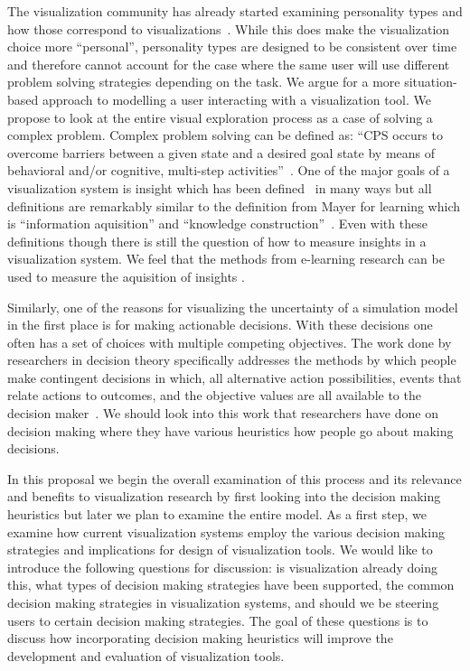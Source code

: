 The visualization community has already started examining personality types and
how those correspond to visualizations~\citep{Conati:2014}. While this does
make the visualization choice more ``personal'', personality types are designed
to be consistent over time and therefore cannot account for the case where the
same user will use different problem solving strategies depending on the task.
We argue for a more situation-based approach to modelling a user interacting
with a visualization tool. We propose to look at the entire visual exploration
process as a case of solving a complex problem. Complex problem solving can be
defined as: ``CPS occurs to overcome barriers between a given state and a
desired goal state by means of behavioral and/or cognitive, multi-step
activities''~\citep{Frensch:2005}. One of the major goals of a visualization
system is insight which has been defined~\citep{Yi:2008a} in many ways but all
definitions are remarkably similar to the definition from Mayer for learning
which is ``information aquisition'' and ``knowledge
construction''~\citep{Mayer:2009}. Even with these definitions though there is
still the question of how to measure insights in a visualization system. We
feel that the methods from e-learning research can be used to measure the
aquisition of insights  
.

Similarly, one of the reasons for visualizing the uncertainty of a simulation
model in the first place is for making actionable decisions. With these
decisions one often has a set of choices with multiple competing objectives.
The work done by researchers in decision theory specifically addresses the
methods by which people make contingent decisions in which, all alternative
action possibilities, events that relate actions to outcomes, and the objective
values are all available to the decision maker~\citep{Payne:1993}.  We should
look into this work that researchers have done on decision making where they
have various heuristics how people go about making decisions. 

In this proposal we begin the overall examination of this process and its
relevance and benefits to visualization research by first looking into the
decision making heuristics but later we plan to examine the entire model.  As a
first step, we examine how current visualization systems employ the 
various decision making strategies
and implications for design of visualization
tools.  We would like to introduce the
following questions for discussion: is visualization already doing this, what
types of decision making strategies have been supported, the common decision
making strategies in visualization systems, and should we be steering users to
certain decision making strategies.
The goal of these questions is to discuss how incorporating decision making
heuristics will improve the development and evaluation of visualization tools.

